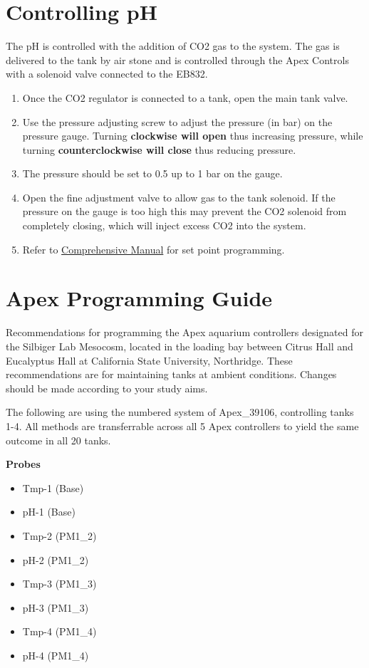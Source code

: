\documentclass[]{book}
\providecommand{\tightlist}{%
  \setlength{\itemsep}{0pt}\setlength{\parskip}{0pt}}
\begin{document}
\chapter{Controlling pH}\label{controlling-ph}

The pH is controlled with the addition of CO2 gas to the system. The gas
is delivered to the tank by air stone and is controlled through the Apex
Controls with a solenoid valve connected to the EB832.

\begin{enumerate}
\def\labelenumi{\arabic{enumi}.}
\tightlist
\item
  Once the CO2 regulator is connected to a tank, open the main tank
  valve.
\item
  Use the pressure adjusting screw to adjust the pressure (in bar) on
  the pressure gauge. Turning \textbf{clockwise will open} thus
  increasing pressure, while turning \textbf{counterclockwise will
  close} thus reducing pressure.
\item
  The pressure should be set to 0.5 up to 1 bar on the gauge.
\item
  Open the fine adjustment valve to allow gas to the tank solenoid. If
  the pressure on the gauge is too high this may prevent the CO2
  solenoid from completely closing, which will inject excess CO2 into
  the system.
\item
  Refer to
  \href{Manuals/Apex_Comprehensive_Reference_Manual.pdf}{Comprehensive
  Manual} for set point programming.
\end{enumerate}

\chapter{Apex Programming Guide}\label{apex-programming-guide}

Recommendations for programming the Apex aquarium controllers designated
for the Silbiger Lab Mesocosm, located in the loading bay between Citrus
Hall and Eucalyptus Hall at California State University, Northridge.
These recommendations are for maintaining tanks at ambient conditions.
Changes should be made according to your study aims.

The following are using the numbered system of Apex\_39106, controlling
tanks 1-4. All methods are transferrable across all 5 Apex controllers
to yield the same outcome in all 20 tanks.

\textbf{Probes}

\begin{itemize}
\tightlist
\item
  Tmp-1 (Base)
\item
  pH-1 (Base)
\item
  Tmp-2 (PM1\_2)
\item
  pH-2 (PM1\_2)
\item
  Tmp-3 (PM1\_3)
\item
  pH-3 (PM1\_3)
\item
  Tmp-4 (PM1\_4)
\item
  pH-4 (PM1\_4)
\end{itemize}
\end{document}
